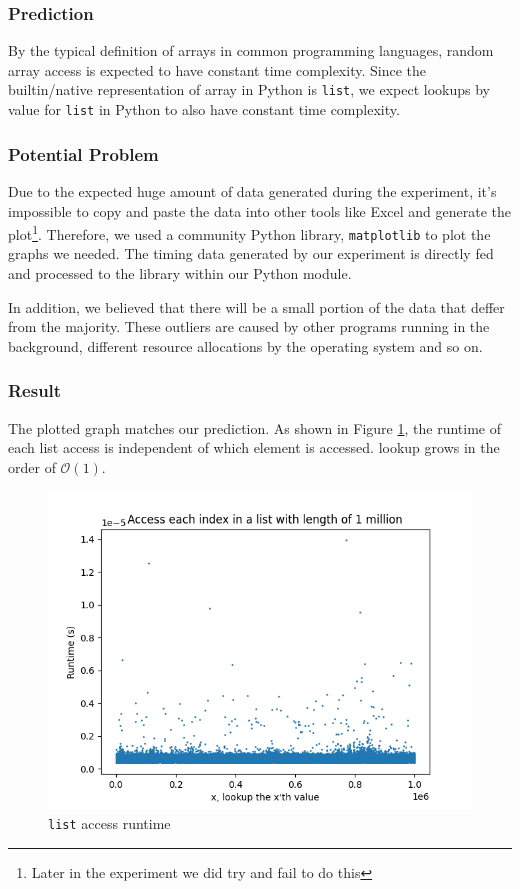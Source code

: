\documentclass[titlepage, 12pt]{article}
\begin{document}
\subsubsection{Prediction}

By the typical definition of arrays in common programming languages, random
array access is expected to have constant time complexity. Since the
builtin/native representation of array in Python is \texttt{list}, we expect
lookups by value for \texttt{list} in Python to also have constant time
complexity.

\subsubsection{Potential Problem}

Due to the expected huge amount of data generated during the experiment, it's
impossible to copy and paste the data into other tools like Excel and generate
the plot\footnote{Later in the experiment we did try and fail to do this}.
Therefore, we used a community Python library, \texttt{matplotlib} to plot the
graphs we needed. The timing data generated by our experiment is directly fed
and processed to the library within our Python module.

In addition, we believed that there will be a small portion of the data that
deffer from the majority. These outliers are caused by other programs running in
the background, different resource allocations by the operating system and so
on.

\subsubsection{Result}

The plotted graph matches our prediction. As shown in Figure \ref{fig:lookup},
the runtime of each list access is independent of which element is accessed.
lookup grows in the order of \( \mathcal{O}(1) \).
\begin{figure}[H]
  \includegraphics[width=0.8\linewidth]{lookup.png}
  \centering
  \caption{\texttt{list} access runtime}
  \label{fig:lookup}
\end{figure}
\end{document}
